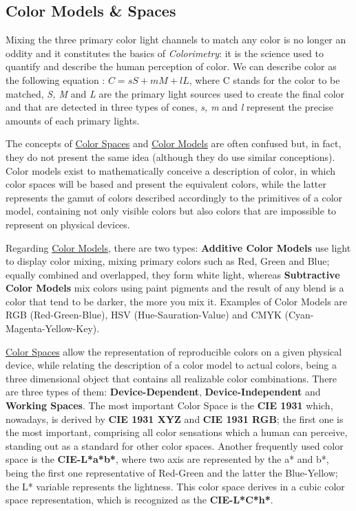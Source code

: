 \subsection{Color Models \& Spaces}
%
Mixing the three primary color light channels to match any color is no longer an oddity and it constitutes
the basics of \emph{Colorimetry}: it is the science used to quantify and describe the human perception of color.
We can describe color as the following equation \cite{Ware2012}: \textbf{$C = sS + mM + lL$}, where C stands for the color
to be matched, \emph{S, M} and \emph{L} are the primary light sources used to create the final color and that are
detected in three types of cones, \emph{s, m} and \emph{l} represent the precise amounts of each primary lights. \par
%
The concepts of \ul{Color Spaces} and \ul{Color Models}
are often confused but, in fact, they do not present the same idea (although they do use similar conceptions). Color models
exist to mathematically conceive a description of color, in which color spaces will be based and present the equivalent
colors, while the latter represents the gamut of colors described accordingly to the primitives of a color model,
containing not only visible colors but also colors that are impossible to represent on physical devices. \par
%
Regarding \ul{Color Models}, there are two types: \textbf{Additive Color Models} use light to display color mixing, mixing
primary colors such as Red, Green and Blue; equally combined and overlapped, they form white light, whereas
\textbf{Subtractive Color Models} mix colors using paint pigments and the result of any blend is a color that tend to be
darker, the more you mix it. Examples of Color Models are RGB (Red-Green-Blue), HSV (Hue-Sauration-Value) and CMYK
(Cyan-Magenta-Yellow-Key). \par
%
\ul{Color Spaces} allow the representation of reproducible colors on a given physical device, while relating the
description of a color model to actual colors, being a three dimensional object that contains all realizable color combinations.
There are three types of them: \textbf{Device-Dependent}, \textbf{Device-Independent} and \textbf{Working Spaces}. The
most important Color Space is the \textbf{CIE 1931} which, nowadays, is derived by \textbf{CIE 1931 XYZ} and \textbf{CIE 1931
RGB}; the first one is the most important, comprising all color sensations which a human can perceive, standing out as a
standard for other color spaces. Another frequently used color space is the \textbf{CIE-L*a*b*}, where two axis are represented
by the a* and b*, being the first one representative of Red-Green and the latter the Blue-Yellow; the L* variable represents the
lightness. This color space derives in a cubic color space representation, which is recognized as the \textbf{CIE-L*C*h*}.
%
